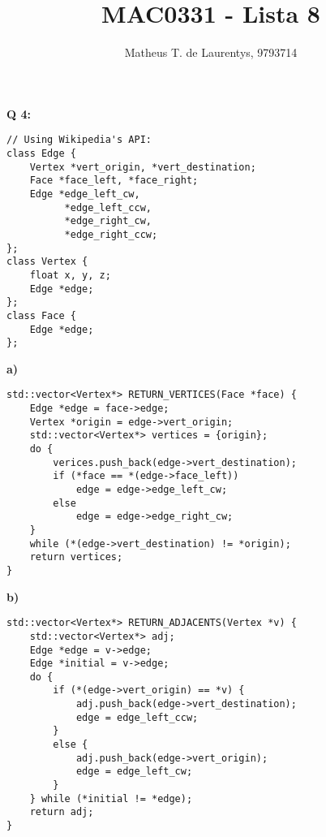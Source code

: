\documentclass[]{article}
\title{\vspace{-4.0cm}MAC0331 - Lista 8}
\author{Matheus T. de Laurentys, 9793714}
\begin{document}
	\maketitle
	\noindent
	\textbf{Q 4:} \\
	\begin{lstlisting}
// Using Wikipedia's API:
class Edge {
	Vertex *vert_origin, *vert_destination;
	Face *face_left, *face_right;
	Edge *edge_left_cw,
	      *edge_left_ccw,
	      *edge_right_cw,
	      *edge_right_ccw;
};
class Vertex {
	float x, y, z;
	Edge *edge;
};
class Face {
	Edge *edge;
};
	\end{lstlisting}
	\textbf{a)}
	\begin{lstlisting}
std::vector<Vertex*> RETURN_VERTICES(Face *face) {
	Edge *edge = face->edge;
	Vertex *origin = edge->vert_origin;
	std::vector<Vertex*> vertices = {origin};
	do {
		verices.push_back(edge->vert_destination);
		if (*face == *(edge->face_left))
			edge = edge->edge_left_cw;
		else
			edge = edge->edge_right_cw;
	}
	while (*(edge->vert_destination) != *origin);
	return vertices;
}
	\end{lstlisting}
	\clearpage
	\textbf{b)}
	\begin{lstlisting}
std::vector<Vertex*> RETURN_ADJACENTS(Vertex *v) {
	std::vector<Vertex*> adj;
	Edge *edge = v->edge;
	Edge *initial = v->edge;
	do {
		if (*(edge->vert_origin) == *v) {
			adj.push_back(edge->vert_destination);
			edge = edge_left_ccw;
		}
		else {
			adj.push_back(edge->vert_origin);
			edge = edge_left_cw;
		}
	} while (*initial != *edge);
	return adj;
}
	\end{lstlisting}
\end{document}
